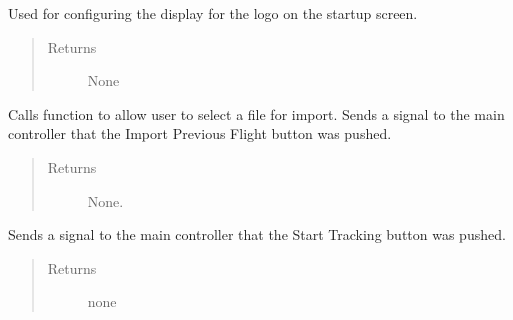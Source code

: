 \documentclass[letterpaper,10pt,english]{sphinxmanual}
\begin{document}
\begin{fulllineitems}
\begin{fulllineitems}
\begin{quote}
\begin{description}
\end{description}\end{quote}

\end{fulllineitems}


\begin{fulllineitems}
\label{\detokenize{index:src.Views.View_StartupScreen.StartupWindow.setupPicture}}
Used for configuring the display for the logo on the startup screen.
\begin{quote}\begin{description}
\item[{Returns}] \leavevmode
None

\end{description}\end{quote}

\end{fulllineitems}


\begin{fulllineitems}
\label{\detokenize{index:src.Views.View_StartupScreen.StartupWindow.signalImportFlight}}
Calls function to allow user to select a file for import.
Sends a signal to the main controller that the Import Previous Flight button was pushed.
\begin{quote}\begin{description}
\item[{Returns}] \leavevmode
None.

\end{description}\end{quote}

\end{fulllineitems}


\begin{fulllineitems}
\label{\detokenize{index:src.Views.View_StartupScreen.StartupWindow.signalStartTracking}}
Sends a signal to the main controller that the Start Tracking button was pushed.
\begin{quote}\begin{description}
\item[{Returns}] \leavevmode
none


\end{description}
\end{quote}
\end{fulllineitems}
\end{fulllineitems}
\end{document}
